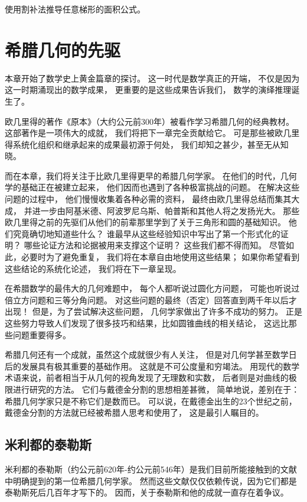 \documentclass[cn,fancy,blue,11pt]{elegantbook}
\begin{document}
\begin{exercise}
	使用割补法推导任意梯形的面积公式。
\end{exercise}

\chapter{希腊几何的先驱}

本章开始了数学史上黄金篇章的探讨。
这一时代是数学真正的开端，
不仅是因为这一时期涌现出的数学成果，
更重要的是这些成果告诉我们，
数学的演绎推理诞生了。

欧几里得的著作《原本》（大约公元前300年）被看作学习希腊几何的经典教材。
这部著作是一项伟大的成就，
我们将把下一章完全贡献给它。
可是那些被欧几里得系统化组织和继承起来的成果最初源于何处，
我们却知之甚少，甚至无从知晓。

而在本章，我们将关注于比欧几里得更早的希腊几何学家。
在他们的时代，几何学的基础正在被建立起来，
他们因而也遇到了各种极富挑战的问题。
在解决这些问题的过程中，
他们慢慢收集着各种必需的资料，
最终由欧几里得总结而集其大成，
并进一步由阿基米德、阿波罗尼乌斯、帕普斯和其他人将之发扬光大。
那些欧几里得之前的先驱们从他们的前辈那里学到了关于三角形和圆的基础知识。
他们究竟确切地知道些什么？
谁最早从这些经验知识中写出了第一个形式化的证明？
哪些论证方法和论据被用来支撑这个证明？
这些我们都不得而知。
尽管如此，必要时为了避免重复，
我们将在本章自由地使用这些结果；
如果你希望看到这些结论的系统化论述，
我们将在下一章呈现。

在希腊数学的最伟大的几何难题中，
每个人都听说过圆化方问题，
可能也听说过倍立方问题和三等分角问题。
对这些问题的最终（否定）回答直到两千年以后才出现！
但是，为了尝试解决这些问题，
几何学家做出了许多不成功的努力。
正是这些努力导致人们发现了很多技巧和结果，比如圆锥曲线的相关结论，
这远比那些问题重要得多。

希腊几何还有一个成就，虽然这个成就很少有人关注，
但是对几何学甚至数学日后的发展具有极其重要的基础作用。
这就是不可公度量和穷竭法。
用现代的数学术语来说，前者相当于从几何的视角发现了无理数和实数，
后者则是对曲线的极限进行研究的方法。
它们与戴德金分割的思想相差甚微，
简单地说，差别在于：希腊几何学家只是不称它们是数而已。
可以说，在戴德金出生的23个世纪之前，
戴德金分割的方法就已经被希腊人思考和使用了，
这是最引人瞩目的。

\section{米利都的泰勒斯}

米利都的泰勒斯（约公元前620年-约公元前546年）是我们目前所能接触到的文献中明确提到的第一位希腊几何学家。
然而这些文献仅仅依赖传说，因为它们都是泰勒斯死后几百年才写下的。
因而，关于泰勒斯和他的成就一直存在着争议。
\end{document}
